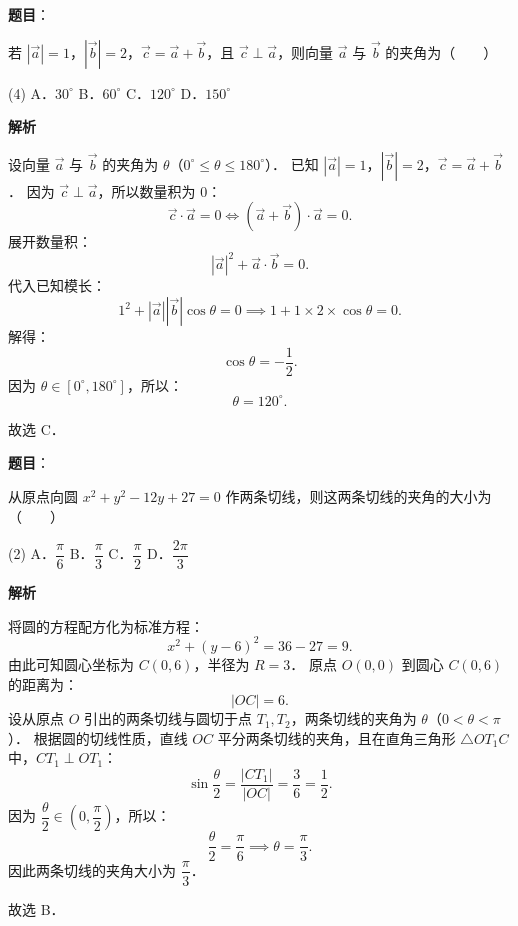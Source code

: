 \begin{answer}

\textbf{题目}：

若 $|\vec{a}| = 1$，$|\vec{b}| = 2$，$\vec{c} = \vec{a} + \vec{b}$，且 $\vec{c} \perp \vec{a}$，则向量 $\vec{a}$ 与 $\vec{b}$ 的夹角为\mbox{（　　）}

\begin{gkopts}(4)
\task A．$30^\circ$
\task B．$60^\circ$
\task C．$120^\circ$
\task D．$150^\circ$
\end{gkopts}

\textbf{解析}

设向量 $\vec{a}$ 与 $\vec{b}$ 的夹角为 $\theta$（$0^\circ \leqslant \theta \leqslant 180^\circ$）．
已知 $|\vec{a}| = 1$，$|\vec{b}| = 2$，$\vec{c} = \vec{a} + \vec{b}$．
因为 $\vec{c} \perp \vec{a}$，所以数量积为 0：
\nopagebreak[4]
\[
\vec{c} \cdot \vec{a} = 0 \iff (\vec{a} + \vec{b}) \cdot \vec{a} = 0.
\]
展开数量积：
\nopagebreak[4]
\[
|\vec{a}|^2 + \vec{a} \cdot \vec{b} = 0.
\]
代入已知模长：
\nopagebreak[4]
\[
1^2 + |\vec{a}| |\vec{b}| \cos\theta = 0 \implies 1 + 1 \times 2 \times \cos\theta = 0.
\]
解得：
\nopagebreak[4]
\[
\cos\theta = -\frac{1}{2}.
\]
因为 $\theta \in [0^\circ, 180^\circ]$，所以：
\nopagebreak[4]
\[
\theta = 120^\circ.
\]

故选 C．


\end{answer}
\begin{answer}

\textbf{题目}：

从原点向圆 $x^2 + y^2 - 12y + 27 = 0$ 作两条切线，则这两条切线的夹角的大小为\mbox{（　　）}

\begin{gkopts}(2)
\task A．$\dfrac{\pi}{6}$
\task B．$\dfrac{\pi}{3}$
\task C．$\dfrac{\pi}{2}$
\task D．$\dfrac{2\pi}{3}$
\end{gkopts}

\textbf{解析}

将圆的方程配方化为标准方程：
\nopagebreak[4]
\[
x^2 + (y - 6)^2 = 36 - 27 = 9.
\]
由此可知圆心坐标为 $C(0, 6)$，半径为 $R = 3$．
原点 $O(0, 0)$ 到圆心 $C(0, 6)$ 的距离为：
\nopagebreak[4]
\[
|OC| = 6.
\]
设从原点 $O$ 引出的两条切线与圆切于点 $T_1, T_2$，两条切线的夹角为 $\theta$（$0 < \theta < \pi$）．
根据圆的切线性质，直线 $OC$ 平分两条切线的夹角，且在直角三角形 $\triangle OT_1C$ 中，$CT_1 \perp OT_1$：
\nopagebreak[4]
\[
\sin\frac{\theta}{2} = \frac{|CT_1|}{|OC|} = \frac{3}{6} = \frac{1}{2}.
\]
因为 $\dfrac{\theta}{2} \in \left(0, \dfrac{\pi}{2}\right)$，所以：
\nopagebreak[4]
\[
\frac{\theta}{2} = \frac{\pi}{6} \implies \theta = \frac{\pi}{3}.
\]
因此两条切线的夹角大小为 $\dfrac{\pi}{3}$．

故选 B．


\end{answer}
